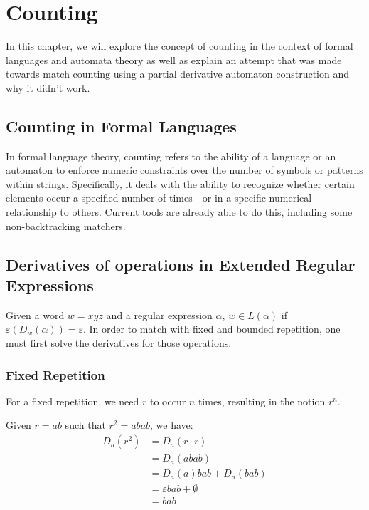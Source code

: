 \chapter{Counting}\label{chap:counting}
In this chapter, we will explore the concept of counting in the context of formal languages and automata theory as well as explain an attempt that was made towards match counting using a partial derivative automaton construction and why it didn't work.

\section{Counting in Formal Languages}
In formal language theory, counting refers to the ability of a language or an automaton to enforce numeric constraints over the number of symbols or patterns within strings. Specifically, it deals with the ability to recognize whether certain elements occur a specified number of times—or in a specific numerical relationship to others.
Current tools are already able to do this, including some non-backtracking matchers.

\section{Derivatives of operations in Extended Regular Expressions}
Given a word $w = xyz$ and a regular expression $\alpha$, $w \in L(\alpha)$ if $\varepsilon(D_w(\alpha)) = \varepsilon$.
In order to match with fixed and bounded repetition, one must first solve the derivatives for those operations.


\break

\subsection{Fixed Repetition}
For a fixed repetition, we need $r$ to occur $n$ times, resulting in the notion $r^n$.

Given $r = ab$ such that $r^2 = abab$, we have:
\begin{align*}
	D_a(r^2) &= D_a(r \cdot r) \\
	&= D_a(abab)  \\
	&= D_a(a)bab + D_a(bab) \\
	&= \varepsilon bab + \emptyset \\
	&= bab
\end{align*}


